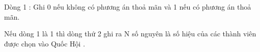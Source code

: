 Dòng 1 : Ghi 0 nếu không có phương án thoả mãn và 1 nếu có phương án thoả mãn.   


   Nếu dòng 1 là 1 thì dòng thứ 2 ghi ra N số nguyên là số hiệu của các thành viên được chọn vào Quốc Hội .